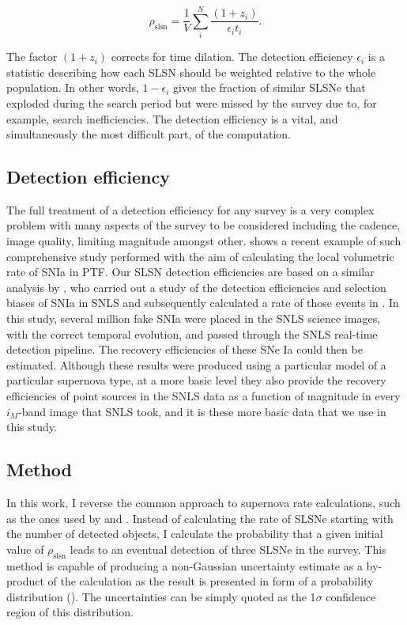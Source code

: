 \begin{equation}
\label{eq:rate}
\rho_{\mathrm{slsn}} = \frac{1}{V}\sum^{N}_{i}\frac{(1+z_i)}{\epsilon_{i}t_{i}}.
\end{equation}

The factor $(1+z_i)$ corrects for time dilation. The detection efficiency $\epsilon_i$ is a statistic describing how each SLSN should be weighted relative to the whole population. In other words, $1-\epsilon_i$ gives the fraction of similar SLSNe that exploded during the search period but were missed by the survey due to, for example, search inefficiencies. The detection efficiency is a vital, and simultaneously the most difficult part, of the computation.

\subsection{Detection efficiency}
The full treatment of a detection efficiency for any survey is a very complex problem with many aspects of the survey to be considered including the cadence, image quality, limiting magnitude amongst other. \citet{Frohmaier2017} shows a recent example of such comprehensive study performed with the aim of calculating the local volumetric rate of SNIa in PTF. Our SLSN detection efficiencies are based on a similar analysis by \citet{Perrett2010}, who carried out a study of the detection efficiencies and selection biases of SNIa in SNLS and subsequently calculated a rate of those events in \cite{Perrett2012}. In this study, several million fake SNIa were placed in the SNLS science images, with the correct temporal evolution, and passed through the SNLS real-time detection pipeline. The recovery efficiencies of these SNe Ia could then be estimated. Although these results were produced using a particular model of a particular supernova type, at a more basic level they also provide the recovery efficiencies of point sources in the SNLS data as a function of magnitude in every $i_M$-band image that SNLS took, and it is these more basic data that we use in this study.

\subsection{Method}
In this work, I reverse the common approach to supernova rate calculations, such as the ones used by \citet{Perrett2012} and \citep{Frohmaier2017}. Instead of calculating the rate of SLSNe starting with the number of detected objects, I calculate the probability that a given initial value of $\rho_{\mathrm{slsn}}$ leads to an eventual detection of three SLSNe in the survey. This method is capable of producing a non-Gaussian uncertainty estimate as a by-product of the calculation as the result is presented in form of a probability distribution (). The uncertainties can be simply quoted as the 1$\sigma$ confidence region of this distribution.

